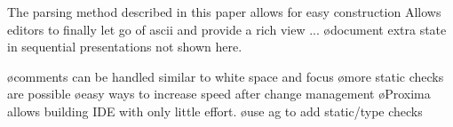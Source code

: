 \documentclass[12pt]{article}
\begin{document}
The parsing method described in this paper allows for easy construction Allows editors to finally let go of ascii and provide a rich view ...
\ec
\bc
\bl
\o document extra state in sequential presentations not shown here.
\el

\bl
\o comments can be handled similar to white space and focus
\o more static checks are possible
\o easy ways to increase speed after change management
\o Proxima allows building IDE with only little effort.
\o use ag to add static/type checks
\el
\ec


%



\end{document}
